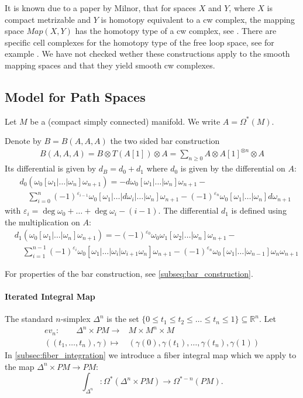 \documentclass{scrartcl}
\theoremstyle{plain}
\theoremstyle{definition}
\newcommand{\R}{\mathbb R}
\renewcommand{\subset}{\subseteq}
\begin{document}
It is known due to a paper by Milnor, that for spaces $X$ and $Y$, where $X$ is compact metrizable and $Y$ is homotopy equivalent to a cw complex, the mapping space $Map(X, Y)$ has the homotopy type of a cw complex, see \cite{milnor1959spaces}. There are specific cell complexes for the homotopy type of the free loop space, see for example \cite{rivera2018combinatorial}. We have not checked wether these constructions apply to the smooth mapping spaces and that they yield smooth cw complexes. 




\subsection{Model for Path Spaces}

Let $M$ be a (compact simply connected) manifold. We write $A=\Omega^*(M)$. 

Denote by $B = B(A, A, A)$ the two sided bar construction
\begin{align*}
    B(A, A, A) = B\otimes T(A[1]) \otimes A = \sum_{n\geq 0} A\otimes A[1]^{\otimes n} \otimes A
\end{align*}
Its differential is given by $d_B = d_0 + d_1$ where $d_0$ is given by the differential on $A$:
\begin{align*}
    &d_0(\omega_0[\omega_1|\dots|\omega_n]\omega_{n+1}) = - d\omega_0[\omega_1|\dots|\omega_n]\omega_{n+1} - \\
    &\quad \sum_{i=0}^n (-1)^{\varepsilon_{i-1}} \omega_0[\omega_1|\dots|d\omega_i|\dots|\omega_n]\omega_{n+1} - (-1)^{\varepsilon_{n}} \omega_0[\omega_1|\dots|\omega_n]d\omega_{n+1}
\end{align*}
with $\varepsilon_i = \deg\omega_0+\dots+\deg\omega_i - (i-1)$. The differential $d_1$ is defined using the multiplication on $A$:
\begin{align*}
    &d_1(\omega_0[\omega_1|\dots|\omega_n]\omega_{n+1}) = -(-1)^{\varepsilon_0}\omega_0\omega_1[\omega_2|\dots|\omega_n]\omega_{n+1} - \\&\quad\sum_{i=1}^{n-1} (-1)^{\varepsilon_i}\omega_0[\omega_1|\dots|\omega_i|\omega_{i+1}\omega_n]\omega_{n+1} - (-1)^{\varepsilon_{n}}\omega_0[\omega_1|\dots|\omega_{n-1}]\omega_{n}\omega_{n+1}
\end{align*}

For properties of the bar construction, see \ref{subseq:bar_construction}. 

\paragraph{Iterated Integral Map} The standard $n$-simplex $\Delta^n$ is the set $\{0\leq t_1\leq t_2\leq \dots\leq t_n\leq 1\} \subset \R^n$. Let 
\begin{align*}
    ev_n\colon\qquad\Delta^n\times PM \to & M\times M^n\times M \\
    ((t_1,\dots, t_n), \gamma)\mapsto &(\gamma(0), \gamma(t_1), \dots, \gamma(t_n), \gamma(1))
\end{align*}
In \ref{subsec:fiber_integration} we introduce a fiber integral map which we apply to the map $\Delta^n\times PM \to PM$: 
$$\int_{\Delta^n}\colon \Omega^*(\Delta^n\times PM) \to \Omega^{*-n}(PM).$$
\end{document}
